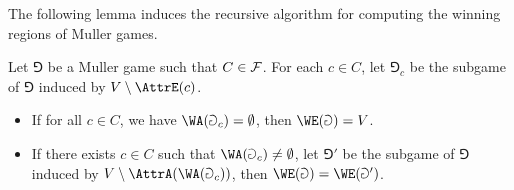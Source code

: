 The following lemma induces the recursive algorithm for computing the winning regions of Muller games.

\begin{lemma}
\label{2-lem:Muller_even}
Let $\Game$ be a Muller game such that $C \in \mathcal{F}$.
For each $c \in C$, let $\Game_c$ be the subgame of $\Game$ induced by $V \setminus \AttrE(c)$.
\begin{itemize}
	\item If for all $c \in C$, we have $\WA(\Game_c) = \emptyset$, then $\WE(\Game) = V$.
	\item If there exists $c \in C$ such that $\WA(\Game_c) \neq \emptyset$,
	let $\Game'$ be the subgame of $\Game$ induced by $V \setminus \AttrA( \WA(\Game_c) )$,
	then $\WE(\Game) = \WE(\Game')$.	
\end{itemize}
\end{lemma}

